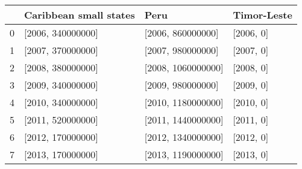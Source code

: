 \begin{tabular}{llll}
\toprule
 & Caribbean small states & Peru & Timor-Leste \\
\midrule
0 & [2006, 340000000] & [2006, 860000000] & [2006, 0] \\
1 & [2007, 370000000] & [2007, 980000000] & [2007, 0] \\
2 & [2008, 380000000] & [2008, 1060000000] & [2008, 0] \\
3 & [2009, 340000000] & [2009, 980000000] & [2009, 0] \\
4 & [2010, 340000000] & [2010, 1180000000] & [2010, 0] \\
5 & [2011, 520000000] & [2011, 1440000000] & [2011, 0] \\
6 & [2012, 170000000] & [2012, 1340000000] & [2012, 0] \\
7 & [2013, 170000000] & [2013, 1190000000] & [2013, 0] \\
\bottomrule
\end{tabular}
